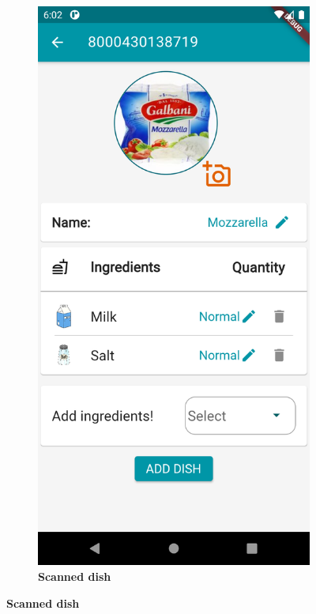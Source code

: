 \documentclass [12pt]{article}
\begin{document}
\begin{description}[leftmargin=1cm,rightmargin=1cm]
\begin{figure}[h!]
\hspace*{\fill}
\begin{subfigure}[tr]{0.3\linewidth}
\includegraphics[width=\linewidth]{addDish3.PNG}
\caption{\textbf{Scanned dish}}

\end{subfigure}
\end{figure}
\end{description}
\end{document}
